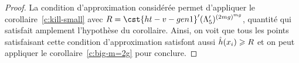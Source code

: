 \begin{proof}
  La condition d'approximation considérée permet d'appliquer le
  corollaire~\vref{c:kill-small} avec
  \( R = \cst{ht-v-gen1}' (\Lambda_5')^{(2mg)^{mg}} \),
  quantité qui satisfait amplement l'hypothèse du corollaire. Ainsi, on voit
  que tous les points satisfaisant cette condition d'approximation satisfont
  aussi \( \hat h (x_i) \geqslant R \) et on peut appliquer le
  corollaire~\vref{c:big-m=2g} pour conclure.
\end{proof}


\cleardoublepage
\endinput

